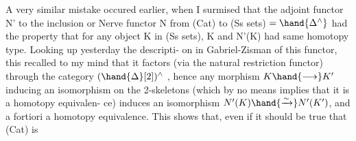 A very similar mistake occured earlier, when I surmised that the
adjoint functor N' to the inclusion or Nerve functor N from (Cat)
to (Ss sets) $=\hand{\Delta^{\wedge}}$ had the property that for any object K in (Ss sets),
K and N'(K) had same homotopy type. Looking up yesterday the descripti-%
on in Gabriel-Zisman of this functor, this recalled to my mind that
it factors (via the natural restriction functor) through the category
$(\hand{\Delta}[2])^{\wedge}$ , hence any morphism $K\hand{\longrightarrow}K'$ inducing an isomorphism on the
2-skeletons (which by no means implies that it is a homotopy equivalen-%
ce) induces an isomorphism $N'(K)\hand{\xrightarrow{\sim}}N'(K')$, and a fortiori a homotopy
equivalence. This shows that, even if it should be true that (Cat) is
